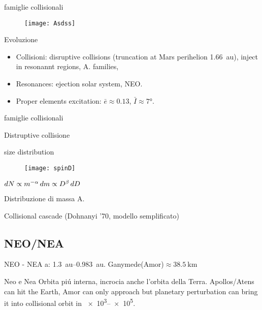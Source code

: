 \begin{frame}{famiglie collisionali}
\begin{figure}[!ht]
\texttt{[image: Asdss]}
\end{figure}
\begin{block}{Evoluzione}
\begin{itemize}
\item Collisioni: disruptive collisions (truncation at Mars perihelion \SI{1.66}{\astronomicalunit}), inject in resonannt regions, A. families,
\item Resonances: ejection solar system, NEO.
\item Proper elements excitation: $\bar{e}\approx0.13$, $\bar{I}\approx\ang{7}$.
\end{itemize}
\end{block}
\end{frame}

\begin{wordonframe}{famiglie collisionali}
\begin{block}{Distruptive collisione}

\end{block}
\end{wordonframe}

\begin{frame}{size distribution}
\begin{figure}[!ht]\texttt{[image: spinD]}
\end{figure}
$dN\propto m^{-\alpha}\,dm\propto D^{\beta}\,dD$
\end{frame}

\begin{wordonframe}{Distribuzione di massa A.}
\begin{block}{Collisional cascade (Dohnanyi '70, modello semplificato)}

\end{block}
\end{wordonframe}

\subsection{NEO/NEA}

\begin{frame}{NEO - NEA}
a: \SIrange{1.3}{0.983}{\astronomicalunit}. Ganymede(Amor)$\approx\SI{38.5}{\kilo\meter}$
\end{frame}

\begin{wordonframe}{Neo e Nea}
Orbita pi\'u interna, incrocia anche l'orbita della Terra. Apollos/Atens can hit the Earth, Amor can only approach but planetary perturbation can bring it into collisional orbit in \SIrange{e3}{e5}{\year}. 
\end{wordonframe}

